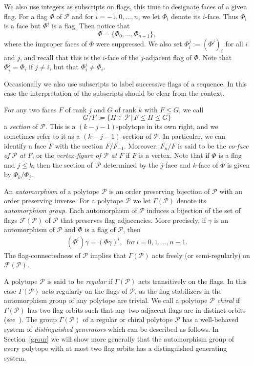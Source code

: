 \documentclass[12pt]{article}
\renewcommand{\>}{\rangle}
\renewcommand{\leq}{\leqslant}
\theoremstyle{definition}\newtheorem{definition}{Definition}[section]
\begin{document}
We also use integers as subscripts on flags, this time to designate faces of a given flag. For a flag $\Phi$ of $\mathcal{P}$ and for $i=-1,0,\dots,n$, we let $\Phi_i$ denote its $i$-face. Thus $\Phi_i$ is a face but $\Phi^i$ is a flag. Then notice that 
\[\Phi = \{\Phi_0,\ldots,\Phi_{n-1}\},\]
where the improper faces of $\Phi$ were suppressed. We also set $\Phi^j_i := (\Phi^j)_i$ for all $i$ and $j$, and recall that this is the $i$-face of the $j$-adjacent flag of $\Phi$. Note that $\Phi^j_i = \Phi_i$ if $j \neq i$, but that $\Phi^i_i \neq \Phi_i$. 

Occasionally we also use subscripts to label successive flags of a sequence. In this case the interpretation of the subscripts should be clear from the context.

For any two faces $F$ of rank $j$ and $G$ of rank $k$ with $F \leq G$, we call
\[G/F := \{ H \in \mathcal{P}\, | \, F \leq H \leq G \}\] 
a \emph{section} of $\mathcal{P}$. This is a $(k-j-1)$-polytope in its own right, and we sometimes refer to it as a $(k-j-1)$-section of $\mathcal{P}$. In particular, we can identify a face $F$ with the section $F/F_{-1}$. Moreover, $F_{n}/F$ is said to be the \emph{co-face of $\mathcal{P}$ at\/} $F$, or the \emph{vertex-figure of $\mathcal{P}$ at\/} $F$ if $F$ is a vertex. Note that if $\Phi$ is a flag and $j \leq k$, then the section of~$\mathcal{P}$ determined by the $j$-face and $k$-face of $\Phi$ is given by $\Phi_k / \Phi_j$. 

An {\em automorphism} of a polytope $\mathcal{P}$ is an order preserving bijection of $\mathcal{P}$ with an order preserving inverse. For a polytope $\mathcal{P}$ we let $\Gamma(\mathcal{P})$ denote its \textit{automorphism group\/}. Each automorphism of $\mathcal{P}$ induces a bijection of the set of flags $\mathcal{F}(\mathcal{P})$ of $\mathcal{P}$ that preserves flag adjacencies. More precisely, if $\gamma$ is an automorphism of $\mathcal{P}$ and $\Phi$ is a flag of $\mathcal{P}$, then
\begin{eqnarray}
\label{auto-adjacent}
(\Phi^i)\gamma = (\Phi\gamma)^i, \;\; \mathrm{for}\ i=0,1,\dots, n-1.
\end{eqnarray}
The flag-connectedness of $\mathcal{P}$ implies that $\Gamma(\mathcal{P})$ acts freely (or semi-regularly) on $\mathcal{F}(\mathcal{P})$. 
\smallskip

A polytope $\mathcal{P}$ is said to be \emph{regular\/} if $\Gamma(\mathcal{P})$ acts  transitively on the flags. In this case $\Gamma(\mathcal{P})$ acts regularly on the flags of $\mathcal{P}$, as the flag stabilizers in the automorphism group of any polytope are trivial. We call a polytope $\mathcal{P}$ \emph{chiral\/} if $\Gamma(\mathcal{P})$ has two flag orbits such that any two adjacent flags are in distinct orbits (see~\cite{P2025,SW1991}). The group $\Gamma(\mathcal{P})$ of a regular or chiral polytope $\mathcal{P}$ has a well-behaved system of \emph{distinguished generators\/} which can be described as follows. In Section~\ref{grour} we will show more generally that the automorphism group of every polytope with at most two flag orbits has a distinguished generating system. 
\end{document}
